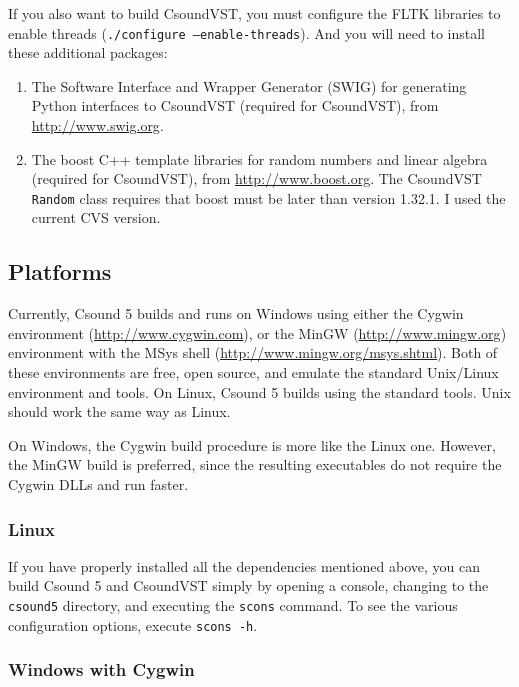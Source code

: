 \documentclass[10pt,letterpaper,onecolumn]{ltxguide}
\begin{document}
If you also want to build CsoundVST, you must configure the FLTK libraries to enable threads (\texttt{./configure ---enable-threads}). And you will need to install these additional packages:

\begin{enumerate}
\item The Software Interface and Wrapper Generator (SWIG) for generating Python interfaces to CsoundVST (required for CsoundVST), from \url{http://www.swig.org}.
\item The boost C++ template libraries for random numbers and linear algebra (required for CsoundVST), from \url{http://www.boost.org}. The CsoundVST \texttt{Random} class requires that boost must be later than version 1.32.1. I used the current CVS version.
\end{enumerate}

\subsection{Platforms}

Currently, Csound 5 builds and runs on Windows using either the Cygwin environment (\url{http://www.cygwin.com}), or the MinGW  (\url{http://www.mingw.org}) environment with the MSys shell (\url{http://www.mingw.org/msys.shtml}). Both of these environments are free, open source, and emulate the standard Unix/Linux environment and tools. On Linux, Csound 5 builds using the standard tools. Unix should work the same way as Linux.

On Windows, the Cygwin build procedure is more like the Linux one. However, the MinGW build is preferred, since the resulting executables do not require the Cygwin DLLs and run faster.

\subsubsection{Linux}

If you have properly installed all the dependencies mentioned above, you can build Csound 5 and CsoundVST simply by opening a console, changing to the \texttt{csound5} directory, and executing the \texttt{scons} command. To see the various configuration options, execute \texttt{scons -h}.

\subsubsection{Windows with Cygwin}
\end{document}
